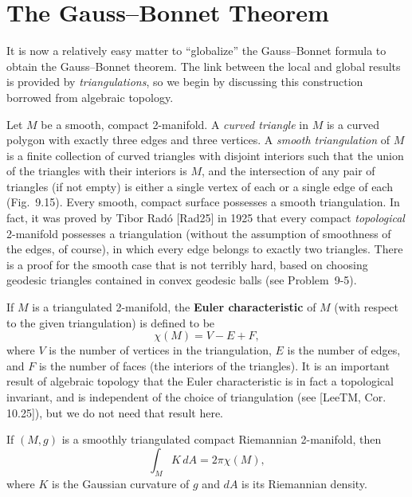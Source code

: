 \section{The Gauss--Bonnet Theorem}

It is now a relatively easy matter to ``globalize'' the Gauss--Bonnet formula to obtain the Gauss--Bonnet theorem. The link between the local and global results is provided by \emph{triangulations}, so we begin by discussing this construction borrowed from algebraic topology.

Let $M$ be a smooth, compact 2-manifold. A \emph{curved triangle} in $M$ is a curved polygon with exactly three edges and three vertices. A \emph{smooth triangulation} of $M$ is a finite collection of curved triangles with disjoint interiors such that the union of the triangles with their interiors is $M$, and the intersection of any pair of triangles (if not empty) is either a single vertex of each or a single edge of each (Fig.~9.15). Every smooth, compact surface possesses a smooth triangulation. In fact, it was proved by Tibor Radó [Rad25] in 1925 that every compact \emph{topological} 2-manifold possesses a triangulation (without the assumption of smoothness of the edges, of course), in which every edge belongs to exactly two triangles. There is a proof for the smooth case that is not terribly hard, based on choosing geodesic triangles contained in convex geodesic balls (see Problem~9-5).

If $M$ is a triangulated 2-manifold, the \textbf{Euler characteristic} of $M$ (with respect to the given triangulation) is defined to be
\[
\chi(M) = V - E + F,
\]
where $V$ is the number of vertices in the triangulation, $E$ is the number of edges, and $F$ is the number of faces (the interiors of the triangles). It is an important result of algebraic topology that the Euler characteristic is in fact a topological invariant, and is independent of the choice of triangulation (see [LeeTM, Cor. 10.25]), but we do not need that result here.

\begin{theorem}
\label{thm:gauss-bonnet-theorem}
If $(M, g)$ is a smoothly triangulated compact Riemannian 2-manifold, then
\[
\int_M K \, dA = 2\pi \chi(M),
\]
where $K$ is the Gaussian curvature of $g$ and $dA$ is its Riemannian density.
\end{theorem}


